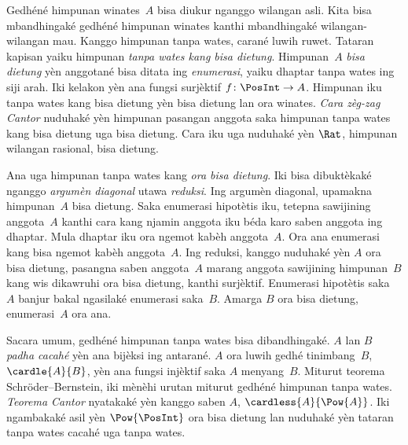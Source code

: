 Gedhéné himpunan winates~$A$ bisa diukur nganggo wilangan asli.
Kita bisa mbandhingaké gedhéné himpunan winates kanthi mbandhingaké
wilangan-wilangan mau. Kanggo himpunan tanpa wates, carané luwih
ruwet. Tataran kapisan yaiku himpunan \emph{tanpa wates kang bisa
dietung}. Himpunan~$A$ \emph{bisa dietung} yèn anggotané bisa
ditata ing \emph{enumerasi}, yaiku dhaptar tanpa wates ing siji
arah. Iki kelakon yèn ana fungsi surjèktif $f\colon\PosInt\to A$.
Himpunan iku tanpa wates kang bisa dietung yèn bisa dietung lan
ora winates. \emph{Cara zèg-zag Cantor} nuduhaké yèn himpunan
pasangan anggota saka himpunan tanpa wates kang bisa dietung
uga bisa dietung. Cara iku uga nuduhaké yèn $\Rat$, himpunan
wilangan rasional, bisa dietung.

Ana uga himpunan tanpa wates kang \emph{ora bisa dietung}.
Iki bisa dibuktèkaké nganggo \emph{argumèn diagonal} utawa
\emph{reduksi}. Ing argumèn diagonal, upamakna himpunan~$A$
bisa dietung. Saka enumerasi hipotètis iku, tetepna sawijining
anggota~$A$ kanthi cara kang njamin anggota iku béda karo saben
anggota ing dhaptar. Mula dhaptar iku ora ngemot kabèh anggota~$A$.
Ora ana enumerasi kang bisa ngemot kabèh anggota~$A$.
Ing reduksi, kanggo nuduhaké yèn $A$ ora bisa dietung, pasangna
saben anggota~$A$ marang anggota sawijining himpunan~$B$ kang wis
dikawruhi ora bisa dietung, kanthi surjèktif. Enumerasi hipotètis
saka~$A$ banjur bakal ngasilaké enumerasi saka~$B$. Amarga $B$
ora bisa dietung, enumerasi~$A$ ora ana.

Sacara umum, gedhéné himpunan tanpa wates bisa dibandhingaké.
$A$ lan $B$ \emph{padha cacahé} yèn ana bijèksi ing antarané.
$A$ ora luwih gedhé tinimbang~$B$, $\cardle{A}{B}$, yèn ana
fungsi injèktif saka $A$ menyang~$B$. Miturut teorema
Schr\"oder--Bernstein, iki mènèhi urutan miturut gedhéné
himpunan tanpa wates. \emph{Teorema Cantor} nyatakaké yèn
kanggo saben $A$, $\cardless{A}{\Pow{A}}$. Iki ngambakaké
asil yèn $\Pow{\PosInt}$ ora bisa dietung lan nuduhaké yèn
tataran tanpa wates cacahé uga tanpa wates.

